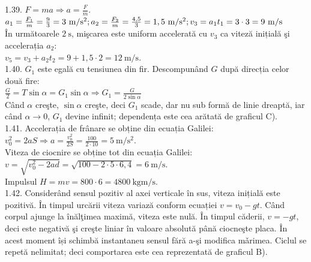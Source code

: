 1.39. $F=m a \Rightarrow a=\frac{F}{m}$.\\ $a_{1}=\frac{F_{1}}{m}=\frac{9}{3}=3 \mathrm{~m} / \mathrm{s}^{2};\\ a_{2}=\frac{F_{2}}{m}=\frac{4,5}{3}=1,5 \mathrm{~m} / \mathrm{s}^{2};\\ v_{3}=a_{1} t_{1}=3 \cdot 3=9 \mathrm{~m} / \mathrm{s}$\\ În următoarele $2 \mathrm{~s}$, mişcarea este uniform accelerată cu $v_{3}$ ca viteză inițială şi accelerația $a_{2}$:\\ $v_{5}=v_{3}+a_{2} t_{2}=9+1,5 \cdot 2=12 \mathrm{~m} / \mathrm{s}$.\\

1.40. $G_{1}$ este egală cu tensiunea din fir. Descompunând $G$ după direcția celor două fire:\\ $\frac{G}{2}=T \sin \alpha =G_{1} \sin \alpha \Rightarrow G_{1}=\frac{G}{2 \sin \alpha}$\\ Când $\alpha$ creşte, $\sin \alpha$ creşte, deci $G_{1}$ scade, dar nu sub formă de linie dreaptă, iar când $\alpha \rightarrow 0$, $G_{1}$ devine infinit; dependența este cea arătată de graficul C).\\

1.41. Accelerația de frânare se obține din ecuația Galilei:\\ $v_{0}^{2}=2 a S \Rightarrow a=\frac{v_{0}^{2}}{2 S}=\frac{100}{2 \cdot 10}=5 \mathrm{~m} / \mathrm{s}^{2}$.\\ Viteza de ciocnire se obține tot din ecuația Galilei:\\ $v=\sqrt{v_{0}^{2}-2 a d}=\sqrt{100-2 \cdot 5 \cdot 6,4}=6 \mathrm{~m} / \mathrm{s}$.\\ Impulsul $H=m v=800 \cdot 6=4800 \mathrm{~kgm} / \mathrm{s}$.\\

1.42. Considerând sensul pozitiv al axei verticale în sus, viteza inițială este pozitivă. În timpul urcării viteza variază conform ecuației $v=v_{0}-g t$. Când corpul ajunge la înălţimea maximă, viteza este nulă. În timpul căderii, $v=-g t$, deci este negativă şi creşte liniar în valoare absolută până ciocneşte placa. În acest moment își schimbă instantaneu sensul fără a-şi modifica mǎrimea. Ciclul se repetă nelimitat; deci comportarea este cea reprezentată de graficul B).\\

